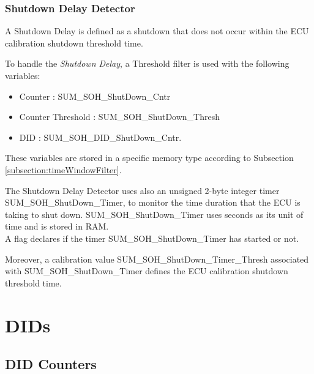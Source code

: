 \subsubsection{Shutdown Delay Detector}
{
    A Shutdown Delay is defined as a shutdown that does not occur within the ECU calibration shutdown threshold time.
}
{
	  
}

{
    To handle the \textit{Shutdown Delay}, a Threshold filter is used  with the following variables:
    \begin{itemize}
		\item Counter           :	SUM_SOH_ShutDown_Cntr
		\item Counter Threshold	:	SUM_SOH_ShutDown_Thresh
		\item DID               :	SUM_SOH_DID_ShutDown_Cntr.
    \end{itemize}
	These variables are stored in a specific memory type according to Subsection \ref{subsection:timeWindowFilter}.
}
{
	  
}

{
	The Shutdown Delay Detector uses also an unsigned 2-byte integer timer SUM_SOH_ShutDown_Timer, to monitor the time duration that the ECU is taking to shut down.
	SUM_SOH_ShutDown_Timer uses seconds as its unit of time and is stored in RAM.\\
	A flag declares if the timer SUM_SOH_ShutDown_Timer has started or not.
}
{
	    
}

{
	Moreover, a calibration value SUM_SOH_ShutDown_Timer_Thresh associated with SUM_SOH_ShutDown_Timer defines the ECU calibration shutdown threshold time.
}
{
}



\section{DIDs}
\subsection{DID Counters}
